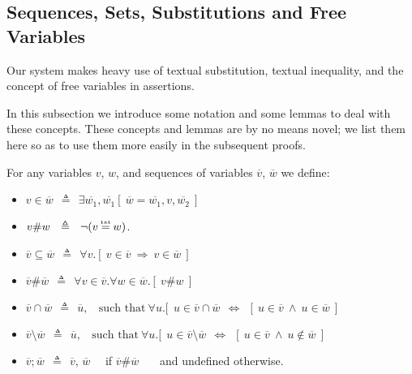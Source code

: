 \newcommand{\Ao}{A_{o}}
\newcommand{\Ain}{A_{in}}
\newcommand{\Aout}{A_{out}}

\subsection{Sequences, Sets, Substitutions and Free Variables}


Our system makes heavy use of textual substitution,   textual inequality, and the concept of free variables in assertions. 
 
In this subsection we introduce some notation and some lemmas to deal with these concepts.
These concepts and lemmas are by no means novel; we list them here so as to use them more easily in the subsequent proofs.


\begin{definition}
For any variables $v$, $w$, and sequences of variables $\overline v$, $\overline w$ we define:
\begin{itemize}
\item
 $v \in \overline w \ \ \triangleq \ \  \exists  \overline {w_1},  \overline {w_1}[\  {\overline w} = \overline {w_1}, v, \overline {w_2} \ ]$
\item
$v \# w \ \ \triangleq \ \ \neg(v \txteq w)$.
\item
$\overline v \subseteq \overline w \ \ \triangleq \ \ \forall v.[\ v \in  \overline v\ \Rightarrow\ v \in  \overline w\ ]$
\item
$\overline v \#  \overline w \ \ \triangleq \ \ \forall v \in  \overline v. \forall w \in  \overline w.  [ \ v \# w\  ]$
\item
$ \overline v \cap \overline w \ \ \triangleq \ \  \overline u, \ \ \ \ \mbox{such that}\   \forall u.[ \ \ u  \in   \overline v \cap \overline w \ \ \Leftrightarrow\ \  [ \ u\in \overline v\ \wedge\ u\in \overline w\  ]$
\item
$ \overline v \setminus \overline w \ \ \triangleq \ \  \overline u, \ \ \ \ \mbox{such that}\   \forall u.[ \ \ u  \in  \overline v \setminus \overline w \ \ \Leftrightarrow\ \  [ \ u\in \overline v\ \wedge\ u\notin \overline w\  ]$
\item
$\overline v; \overline w \ \ \triangleq \ \ \overline v$, $\overline w$ \ \ if $\overline v \#  \overline w $ \ \ \ and  undefined otherwise.
\end{itemize}
\end{definition}

